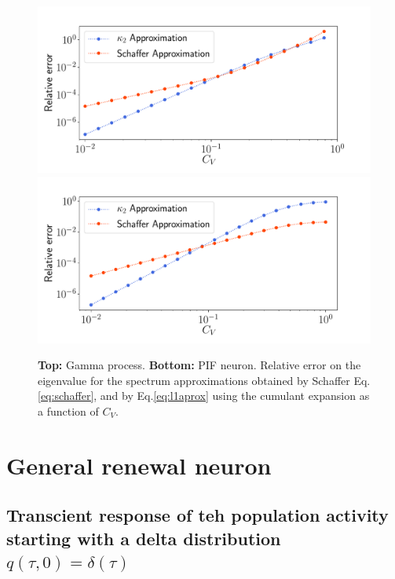 \documentclass[12pt,twoside]{report}
\begin{document}
\begin{figure}[h!]
	\centering
	\includegraphics[width=0.8\linewidth]{kumulant_gamma.pdf}
	\centering
	\includegraphics[width=0.8\linewidth]{kumulant_pif.pdf}
	\caption{\textbf{Top:} Gamma process. \textbf{Bottom:} PIF neuron. Relative error on the eigenvalue for the spectrum approximations obtained by Schaffer Eq.\eqref{eq:schaffer}, and by Eq.\eqref{eq:l1aprox} using the cumulant expansion as a function of $C_V$.}
	\label{fig:kumulant}
\end{figure}








\chapter{General renewal neuron}
\section{Transcient response of teh population activity starting with a delta distribution $q(\tau,0)=\delta(\tau)$}
\end{document}
